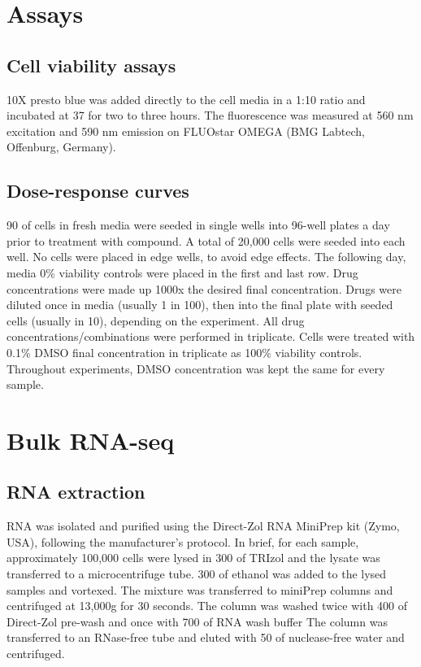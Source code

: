 
\section{Assays}
\subsection{Cell viability assays}
10X presto blue was added directly to the cell media in a 1:10 ratio and incubated at 37\C{} for two to three hours.
The fluorescence was measured at 560 nm excitation and 590 nm emission on FLUOstar OMEGA (BMG Labtech, Offenburg, Germany).

\subsection{Dose-response curves}\label{subsec:method_doseresponse}
90\ul{} of cells in fresh media were seeded in single wells into 96-well plates a day prior to treatment with compound.
A total of 20,000 cells were seeded into each well.
No cells were placed in edge wells, to avoid edge effects.
The following day, media 0\% viability controls were placed in the first and last row.
Drug concentrations were made up 1000x the desired final concentration.
Drugs were diluted once in media (usually 1 in 100), then into the final plate with seeded cells (usually in 10), depending on the experiment.
All drug concentrations/combinations were performed in triplicate.
Cells were treated with 0.1\% DMSO final concentration in triplicate as 100\% viability controls.
Throughout experiments, DMSO concentration was kept the same for every sample.

\section{Bulk RNA-seq}\label{sec:bulk_lib_prep}
\subsection{RNA extraction}\label{subsec:rna_extraction}
RNA was isolated and purified using the Direct-Zol RNA MiniPrep kit (Zymo, USA), following the manufacturer's protocol.
In brief, for each sample, approximately 100,000 cells were lysed in 300\ul{} of TRIzol and the lysate was transferred to a microcentrifuge tube.
300\ul{} of ethanol was added to the lysed samples and vortexed.
The mixture was transferred to miniPrep columns and centrifuged at 13,000g for 30 seconds.
The column was washed twice with 400\ul{} of Direct-Zol pre-wash and once with 700\ul{} of RNA wash buffer
The column was transferred to an RNase-free tube and eluted with 50\ul{} of nuclease-free water and centrifuged.

